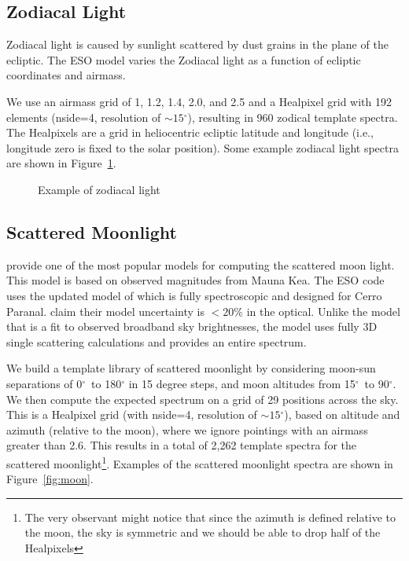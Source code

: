 \documentclass{emulateapj}  %
\newcommand\degree{{^\circ}}
\begin{document}
\subsection{Zodiacal Light}
Zodiacal light is caused by sunlight scattered by dust grains in the plane of the ecliptic.  The ESO model varies the Zodiacal light as a function of ecliptic coordinates and airmass.  

We use an airmass grid of 1, 1.2, 1.4, 2.0, and 2.5 and a Healpixel grid with 192 elements (nside=4, resolution of $\sim15\degree$), resulting in 960 zodical template spectra.  The Healpixels are a grid in heliocentric ecliptic latitude and longitude (i.e., longitude zero is fixed to the solar position).  Some example zodiacal light spectra are shown in Figure~\ref{fig:zodiacal}. 

\begin{figure}
  \caption{Example of zodiacal light \label{fig:zodiacal}}
\end{figure}


\subsection{Scattered Moonlight}

\citet{Krisciunas91} provide one of the most popular models for computing the scattered moon light. This model is based on observed magnitudes from Mauna Kea. The ESO code uses the updated model of \citet{Jones13} which is fully spectroscopic and designed for Cerro Paranal. \citet{Jones13} claim their model uncertainty is $<20$\% in the optical.  Unlike the \citet{Krisciunas91} model that is a fit to observed broadband sky brightnesses, the \citet{Jones13} model uses fully 3D single scattering calculations and provides an entire spectrum.

We build a template library of scattered moonlight by considering moon-sun separations of 0$\degree$\ to 180$\degree$ in 15 degree steps, and moon altitudes from 15$\degree$\ to 90$\degree$.  We then compute the expected spectrum on a grid of 29 positions across the sky. This is a Healpixel grid (with nside=4, resolution of $\sim15\degree$), based on altitude and azimuth (relative to the moon), where we ignore pointings with an airmass greater than 2.6. This results in a total of 2,262 template spectra for the scattered moonlight\footnote{The very observant might notice that since the azimuth is defined relative to the moon, the sky is symmetric and we should be able to drop half of the Healpixels}. Examples of the scattered moonlight spectra are shown in Figure~\ref{fig:moon}.
\end{document}
